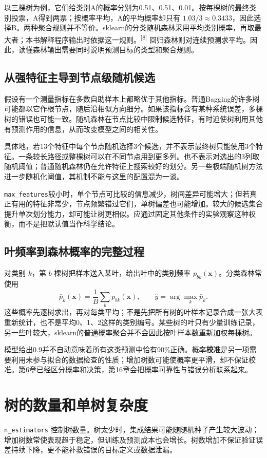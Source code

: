 以三棵树为例，它们给类别A的概率分别为0.51、0.51、0.01。按每棵树的最终类别投票，A得到两票；按概率平均，A的平均概率却只有 $1.03/3\approx0.3433$，因此选择B。两种聚合规则并不等价。sklearn的分类随机森林采用平均类别概率，再取最大者；本书解释程序输出时依据这一规则。\textsuperscript{[8]}
回归森林则对连续预测求平均。因此，读懂森林输出需要同时说明预测目标的类型和聚合规则。

\subsection{从强特征主导到节点级随机候选}
假设有一个测量指标在多数自助样本上都略优于其他指标。普通Bagging的许多树可能都以它作根节点，随后沿相似方向细分。如果该指标含有某种系统误差，多棵树的错误也可能一致。随机森林在节点比较中限制候选特征，有时迫使树利用其他有预测作用的信息，从而改变模型之间的相关性。

具体地，若13个特征中每个节点随机选择3个候选，并不表示最终树只能使用3个特征。一条较长路径或整棵树可以在不同节点用到更多列。也不表示对选出的3列取随机阈值；普通随机森林仍在允许特征上搜索较好的划分。另一些极端随机树方法进一步随机化阈值，其机制不能与这里的配置混为一谈。

\texttt{max\_features}较小时，单个节点可比较的信息减少，树间差异可能增大；但若真正有用的特征非常少，节点频繁错过它们，单树偏差也可能增加。较大的候选集合提升单次划分能力，却可能让树更相似。应通过固定其他条件的实验观察这种权衡，而不是把默认值当作科学结论。

\subsection{叶频率到森林概率的完整过程}
对类别 $k$，第 $b$ 棵树把样本送入某叶，给出叶中的类别频率 $p_{bk}(\mathbf x)$。分类森林常使用
\[
\bar p_k(\mathbf x)=\frac1B\sum_b p_{bk}(\mathbf x),\qquad
\hat y=\arg\max_k\bar p_k.
\]
这些概率先逐树求出，再对每类平均；不是先把所有树的叶样本记录合成一张大表重新统计，也不是平均0、1、2这样的类别编号。某些树的叶只有少量训练记录，另一些叶较大，sklearn的普通概率聚合并不会因此按叶样本数重新加权每棵树。

模型给出0.9并不自动意味着所有这类预测中恰有90\%正确。概率\textbf{校准}是另一项需要利用未参与拟合的数据检查的性质；增加树数可能使概率更平滑，却不保证校准。第6章已经区分概率和决策，第16章会把概率可靠性与错误分析联系起来。

\section{树的数量和单树复杂度}
\texttt{n\_estimators} 控制树数量。树太少时，集成结果可能随随机种子产生较大波动；增加树数常使表现趋于稳定，但训练及预测成本也会增长。树数增加不保证验证误差持续下降，更不能补救错误的目标定义或数据泄漏。


